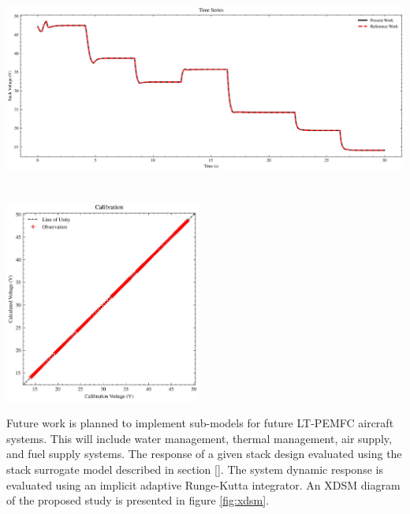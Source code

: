 \noindent
\begin{minipage}[t]{\linewidth}
	\begin{center}
		\includegraphics[height=18em]{figures/voltage_ts.jpg}
	\end{center}
\end{minipage}%
\hfill\vspace{1em}
\begin{minipage}[t]{\linewidth}
	\begin{center}
		\includegraphics[height=18em]{figures/voltage_cal.jpg}
	\end{center}
\end{minipage}

Future work is planned to implement sub-models for future LT-PEMFC aircraft systems. This will include water management, thermal management, air supply, and fuel supply systems. The response of a given stack design evaluated using the stack surrogate model described in section []. The system dynamic response is evaluated using an implicit adaptive Runge-Kutta integrator. An XDSM diagram of the proposed study is presented in figure \ref{fig:xdsm}.

